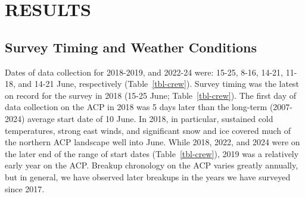 \documentclass[
]{article}
\begin{document}
\section*{RESULTS}\label{results}

\subsection*{Survey Timing and Weather
Conditions}\label{survey-timing-and-weather-conditions-1}

Dates of data collection for 2018-2019, and 2022-24 were: 15-25, 8-16,
14-21, 11-18, and 14-21 June, respectively (Table~\ref{tbl-crew}).
Survey timing was the latest on record for the survey in 2018 (15-25
June; Table~\ref{tbl-crew}). The first day of data collection on the ACP
in 2018 was 5 days later than the long-term (2007-2024) average start
date of 10 June. In 2018, in particular, sustained cold temperatures,
strong east winds, and significant snow and ice covered much of the
northern ACP landscape well into June. While 2018, 2022, and 2024 were
on the later end of the range of start dates (Table~\ref{tbl-crew}),
2019 was a relatively early year on the ACP. Breakup chronology on the
ACP varies greatly annually, but in general, we have observed later
breakups in the years we have surveyed since 2017.

\begingroup\fontsize{10}{12}\selectfont
\end{document}
